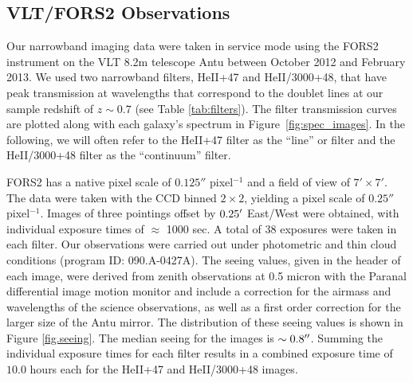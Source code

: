 \documentclass[twocolumn]{aastex62}
\begin{document}
\subsection{VLT/FORS2 Observations}
Our narrowband imaging data were taken in service mode using the FORS2 instrument on the VLT 8.2m telescope Antu between October 2012 and February 2013. 
We used two narrowband filters, HeII+47 and HeII/3000+48, that have peak transmission at wavelengths that correspond to the  doublet lines at our sample redshift of $z\sim0.7$ (see Table \ref{tab:filters}). The filter transmission curves are plotted along with each galaxy's spectrum in Figure~\ref{fig:spec_images}.
In the following, we will often refer to the HeII+47 filter as the ``line'' or  filter and the HeII/3000+48 filter as the ``continuum'' filter.

FORS2 has a native pixel scale of $0.125''$ pixel$^{-1}$ and a field of view of $7'\times7'$.  The data were taken with 
the CCD binned $2\times2$, yielding a pixel scale of $0.25''$ pixel$^{-1}$.
Images of three pointings offset by $0.25\mbox{$^\prime$}$ East/West were obtained, with individual exposure times of $\approx$ 1000 sec.  A total of 38  exposures were taken in each filter. 
Our observations were carried out under photometric and thin cloud conditions (program ID: 090.A-0427A). 
The seeing values, given in the header of each image, were derived from zenith observations at 0.5 micron with the Paranal differential image motion monitor \citep[DIMM;][]{Sarazin1990} and include a correction for the airmass and wavelengths of the science observations, as well as a first order correction for the larger size of the Antu mirror. The distribution of these seeing values is shown in Figure \ref{fig.seeing}. The median seeing for the images is $\sim 0.8\mbox{$^{\prime\prime}$}$. Summing the individual exposure times for each filter results in a combined exposure time of $10.0$ hours each for the HeII+47 and HeII/3000+48 images.
\end{document}

